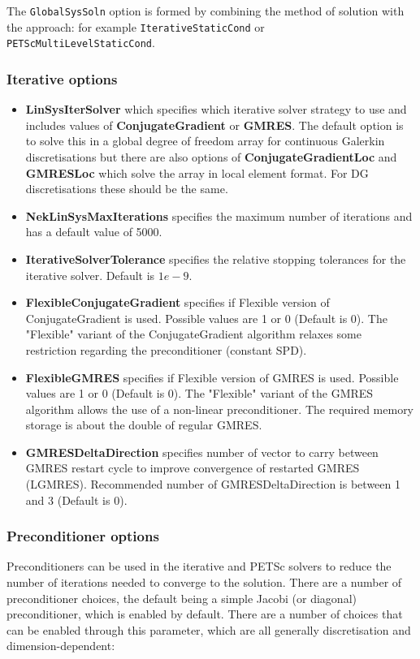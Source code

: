 The \texttt{GlobalSysSoln} option is formed by combining the method of solution
with the approach: for example \texttt{IterativeStaticCond} or
\texttt{PETScMultiLevelStaticCond}.

\subsubsection{Iterative  options}
\begin{itemize}
\item \textbf{LinSysIterSolver} which specifies which iterative solver
  strategy to use and includes values of \textbf{ConjugateGradient} or
  \textbf{GMRES}. The default option is to solve this in a global
  degree of freedom array for continuous Galerkin discretisations but
  there are also options of \textbf{ConjugateGradientLoc} and
  \textbf{GMRESLoc} which solve the array in local element format. For
  DG discretisations these should be the same.
\item \textbf{NekLinSysMaxIterations} specifies the maximum number of
  iterations and has a default value of 5000.
\item \textbf{IterativeSolverTolerance} specifies the relative
  stopping tolerances for the iterative solver. Default is $1e-9$.
\item \textbf{FlexibleConjugateGradient} specifies if Flexible version of 
  ConjugateGradient is used. Possible values are 1 or 0 (Default is 0). 
  The "Flexible" variant of the ConjugateGradient algorithm relaxes some 
  restriction regarding the preconditioner (constant SPD).
\item \textbf{FlexibleGMRES} specifies if Flexible version of GMRES is used. 
  Possible values are 1 or 0 (Default is 0). The "Flexible" variant of the 
  GMRES algorithm allows the use of a non-linear preconditioner. The required
  memory storage is about the double of regular GMRES.
\item \textbf{GMRESDeltaDirection} specifies number of vector to carry between
  GMRES restart cycle to improve convergence of restarted GMRES (LGMRES). Recommended
  number of GMRESDeltaDirection is between 1 and 3 (Default is 0). 
\end{itemize} 

\subsubsection{Preconditioner options}

Preconditioners can be used in the iterative and PETSc solvers to reduce the
number of iterations needed to converge to the solution. There are a number of
preconditioner choices, the default being a simple Jacobi (or diagonal)
preconditioner, which is enabled by default. There are a number of choices that
can be enabled through this parameter, which are all generally discretisation
and dimension-dependent:

